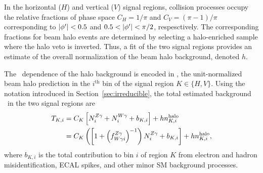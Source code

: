 In the horizontal ($H$) and vertical ($V$) signal regions, collision processes occupy the relative fractions of phase space $C_{H} = 1/\pi$ and $C_{V} = (\pi-1)/\pi$ corresponding to $\abs{\phi'} < 0.5$ and $0.5 < \abs{\phi'} < \pi/2$, respesctively. 
The corresponding fractions for beam halo events are determined by selecting a halo-enriched sample where the halo veto is inverted. 
Thus, a fit of the two signal regions provides an estimate of the overall normalization of the beam halo background, denoted $h$.
 
The \ETg\ dependence of the halo background is encoded in \nhalo[,i], the unit-normalized beam halo prediction in the $i^\mathrm{th}$ bin of the signal region $K \in \{H,V\}$.
Using the notation introduced in Section~\ref{sec:irreducible}, the total estimated background \TK\ in the two signal regions are
\begin{equation}
\begin{aligned}
  \TK[,i] & = C_{K} \left[ \NZg[i] + \NWg[i] + b_{K,i}\right] + h \nhalo[,i]  \\
          & = C_{K} \left( \left[1 + \left(\fZW[i]\right)^{-1}\right) \NZg[i] + b_{K,i}\right] + h \nhalo[,i],
\end{aligned}
\end{equation}
where $b_{K,i}$ is the total contribution to bin $i$ of region $K$ from electron and hadron misidentification, ECAL spikes, and other minor SM background processes.
